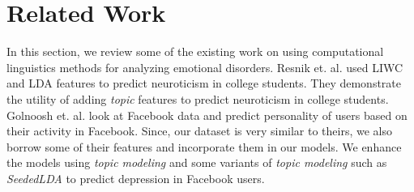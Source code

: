 \section{Related Work}
\label{sec:relatedwork}

In this section, we review some of the existing work on using computational linguistics methods for analyzing emotional disorders. Resnik et. al. \cite{ResnikGR13} used LIWC and LDA features to predict neuroticism in college students.  They demonstrate the utility of adding \textit{topic} features to predict neuroticism in college students. Golnoosh et. al. look at Facebook data and predict personality of users based on their activity in Facebook. Since, our dataset is very similar to theirs, we also borrow some of their features and incorporate them in our models. We enhance the models using \textit{topic modeling} and some variants of \textit{topic modeling} such as \textit{SeededLDA} to predict depression in Facebook users.

